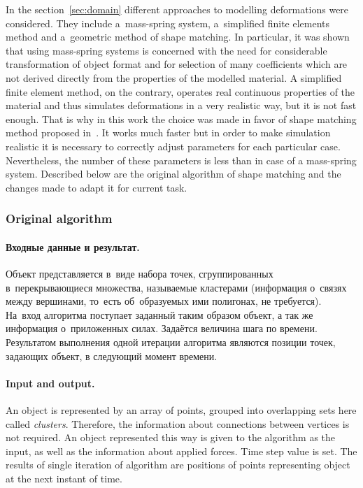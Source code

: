 \documentclass[a4paper, 12pt, titlepage]{extarticle}
\begin{document}
      In the section~\ref{sec:domain} different approaches to modelling deformations were
      considered. They include a~mass-spring system, a~simplified finite elements method and
      a~geometric method of shape matching. In particular, it was shown that using mass-spring
      systems is concerned with the need for considerable transformation of object format and for
      selection of many coefficients which are not derived directly from the properties of the
      modelled material. A simplified finite element method, on the contrary, operates real
      continuous properties of the material and thus simulates deformations in a very realistic way,
      but it is not fast enough. That is why in this work the choice was made in favor of shape
      matching method proposed in~\cite{mueller-meshless}. It works much faster but in order to make
      simulation realistic it is necessary to correctly adjust parameters for each particular case.
      Nevertheless, the number of these parameters is less than in case of a mass-spring system.
      Described below are the original algorithm of shape matching and the changes made to adapt it
      for current task.

      \subsubsection{Original algorithm}\label{sssec:original_algorithm}

\begin{original}
        \paragraph{Входные данные и результат.} Объект представляется в~виде набора точек,
        сгруппированных в~перекрывающиеся множества, называемые кластерами
        (информация о~связях между вершинами, то~есть об~образуемых ими полигонах, не требуется).
        На~вход алгоритма поступает заданный таким образом объект, а так же информация о~приложенных
        силах. Задаётся величина шага по времени. Результатом выполнения одной итерации алгоритма
        являются позиции точек, задающих объект, в следующий момент времени.
\end{original}

        \paragraph{Input and output.} An object is represented by an array of points, grouped into
        overlapping sets here called \emph{clusters}. Therefore, the information about connections between
        vertices is not required. An object represented this way is given to the algorithm as the
        input, as well as the information about applied forces. Time step value is set. The results
        of single iteration of algorithm are positions of points representing object at the next
        instant of time.
\end{document}
